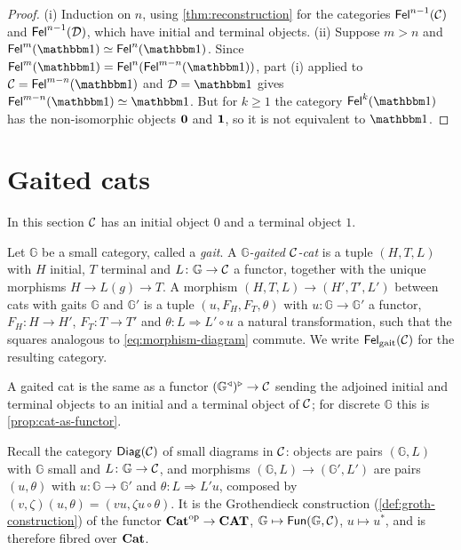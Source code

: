 \begin{proof}
(i) Induction on $n$, using \cref{thm:reconstruction} for the categories
$\mathsf{Fel}^{n-1}(\mathcal{C})$ and $\mathsf{Fel}^{n-1}(\mathcal{D})$, which have initial and terminal
objects. (ii) Suppose $m>n$ and $\Fel^m(\one)\eqv\Fel^n(\one)$. Since
$\Fel^m(\one)=\Fel^n(\Fel^{m-n}(\one))$, part (i) applied to
$\cC=\Fel^{m-n}(\one)$ and $\cD=\one$ gives $\Fel^{m-n}(\one)\eqv\one$. But for $k\geq1$ the category $\Fel^k(\one)$ has the
non-isomorphic objects $\mathbf{0}$ and $\mathbf{1}$, so it is not equivalent to $\one$.
\end{proof}

\section{Gaited cats}\label{sec:gaits}

\begin{assumption}\label{ass:gaits}
In this section $\mathcal{C}$ has an initial object $0$ and a terminal object $1$.
\end{assumption}

\begin{definition}\label{def:gaited-cat}
Let $\mathbb G$ be a small category, called a \emph{gait}. A
\emph{$\mathbb G$-gaited $\mathcal{C}$-cat} is a tuple $(H,T,L)$ with $H$ initial, $T$
terminal and $L\colon\mathbb G\to\mathcal{C}$ a functor, together with the unique
morphisms $H\to L(g)\to T$. A morphism $(H,T,L)\to(H',T',L')$ between cats with
gaits $\mathbb G$ and $\mathbb G'$ is a tuple $(u,F_H,F_T,\theta)$ with
$u\colon\mathbb G\to\mathbb G'$ a functor, $F_H\colon H\to H'$, $F_T\colon T\to T'$
and $\theta\colon L\Rightarrow L'\circ u$ a natural transformation, such that the
squares analogous to \eqref{eq:morphism-diagram} commute. We write
$\mathsf{Fel}_{\mathrm{gait}}(\mathcal{C})$ for the resulting category.
\end{definition}

A gaited cat is the same as a functor $(\mathbb G^{\triangleleft})^{\triangleright}\to\mathcal{C}$
sending the adjoined initial and terminal objects to an initial and a terminal
object of $\mathcal{C}$; for discrete $\mathbb G$ this is \cref{prop:cat-as-functor}.

Recall the category $\mathsf{Diag}(\mathcal{C})$ of small diagrams in $\mathcal{C}$: objects are pairs
$(\mathbb G,L)$ with $\mathbb G$ small and $L\colon\mathbb G\to\mathcal{C}$, and morphisms
$(\mathbb G,L)\to(\mathbb G',L')$ are pairs $(u,\theta)$ with $u\colon\mathbb G\to\mathbb G'$
and $\theta\colon L\Rightarrow L'u$, composed by $(v,\zeta)(u,\theta)=(vu,\zeta u\circ\theta)$.
It is the Grothendieck construction (\cref{def:groth-construction}) of the functor
$\mathbf{Cat}^{\mathrm{op}}\to\mathbf{CAT}$, $\mathbb G\mapsto\mathsf{Fun}(\mathbb G,\mathcal{C})$, $u\mapsto u^*$, and is
therefore fibred over $\mathbf{Cat}$.

